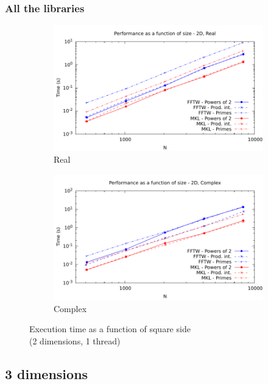 \documentclass[12pt, a4paper]{article}
\begin{document}
\subsubsection{All the libraries}
\begin{figure}[H]
\captionsetup{width=0.8\linewidth}
\centering
\begin{subfigure}{.5\textwidth}
\centering
\includegraphics[width=.9\linewidth]{graphs/performance/2d-r.pdf}
\caption{Real}
\label{2DR}
\end{subfigure}%
\begin{subfigure}{.5\textwidth}
\centering
\includegraphics[width=.9\linewidth]{graphs/performance/2d-c.pdf}
\caption{Complex}
\label{2DC}
\end{subfigure}
\caption{Execution time as a function of square side\\(2 dimensions, 1 thread)}
\label{2D}
\end{figure}

\subsection{3 dimensions}\label{3DS}
\end{document}
